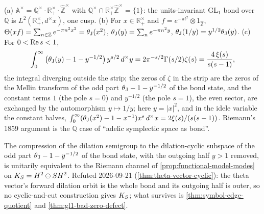 \begin{proposition}
\label{prop:riemann-theta-dilation-bond}
(a) $\mathbb A^\times = \mathbb Q^\times\cdot\mathbb R_+^\times\cdot\hat{\mathbb Z}^\times$ with
$\mathbb Q^\times\cap\mathbb R_+^\times\hat{\mathbb Z}^\times = \{1\}$: the units-invariant GL$_1$ bond over
$\mathbb Q$ is $L^2(\mathbb R_+^\times,d^\times x)$, one cusp. (b) For $x\in\mathbb R_+^\times$ and
$f = e^{-\pi t^2}\otimes1_{\hat{\mathbb Z}}$, $\Theta(xf) = \sum_{n\in\mathbb Z}e^{-\pi n^2x^2} = \theta_{\mathrm J}(x^2)$,
$\theta_{\mathrm J}(y) = \sum_ne^{-\pi n^2y}$, $\theta_{\mathrm J}(1/y) = y^{1/2}\theta_{\mathrm J}(y)$. (c) For $0<\operatorname{Re} s<1$,
\[
\int_0^\infty\big(\theta_{\mathrm J}(y)-1-y^{-1/2}\big)\,y^{s/2}\,d^\times y = 2\pi^{-s/2}\Gamma(s/2)\zeta(s) = \frac{4\,\xi(s)}{s(s-1)},
\]
the integral diverging outside the strip; the zeros of $\zeta$ in the strip are the zeros of the Mellin transform of
the odd part $\theta_{\mathrm J}-1-y^{-1/2}$ of the bond state, and the constant terms $1$ (the pole $s = 0$) and $y^{-1/2}$ (the
pole $s = 1$), the even sector, are exchanged by the automorphism $y\mapsto1/y$; here $y = |x|^2$, and in the idele
variable the constant halves, $\int_0^\infty(\theta_{\mathrm J}(x^2)-1-x^{-1})x^s\,d^\times x = 2\xi(s)/(s(s-1))$. Riemann's 1859 argument is the $\mathbb Q$ case of
``adelic symplectic space as bond''.
\end{proposition}

\begin{conjecture}[H-THETA]
\label{conj:h-theta}
The compression of the dilation semigroup to the dilation-cyclic subspace of the odd part $\theta_{\mathrm J}-1-y^{-1/2}$ of the
bond state, with the outgoing half $y>1$ removed, is unitarily equivalent to the Riemann channel of
\cref{prop:functional-model-modes} on $K_S = H^2\ominus S H^2$.
Refuted 2026-09-21 (\cref{thm:theta-vector-cyclic}): the theta vector's forward dilation orbit is the whole bond and its outgoing half is outer, so no cyclic-and-cut construction gives $K_S$; what survives is \cref{thm:symbol-edge-quotient} and \cref{thm:gl1-bad-zero-defect}.
\end{conjecture}

